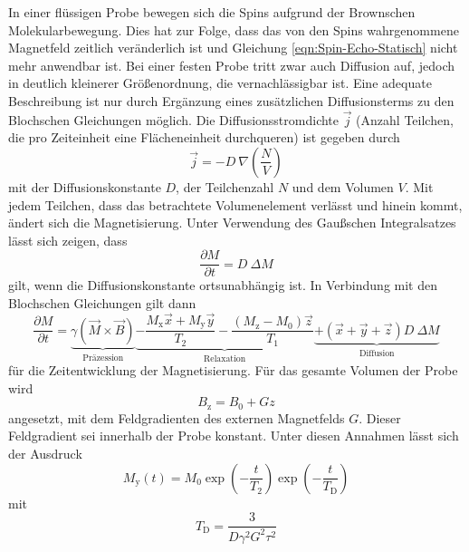 In einer flüssigen Probe bewegen sich die Spins aufgrund der Brownschen
Molekularbewegung.
Dies hat zur Folge, dass das von den Spins wahrgenommene Magnetfeld
zeitlich veränderlich ist und Gleichung \eqref{eqn:Spin-Echo-Statisch} nicht mehr
anwendbar ist.
Bei einer festen Probe tritt zwar auch Diffusion auf, jedoch in deutlich kleinerer
Größenordnung, die vernachlässigbar ist.
Eine adequate Beschreibung ist nur durch Ergänzung eines zusätzlichen Diffusionsterms
zu den Blochschen Gleichungen möglich.
Die Diffusionsstromdichte $\vec{j}$ (Anzahl Teilchen, die pro Zeiteinheit eine
Flächeneinheit durchqueren) ist gegeben durch
\begin{equation*}
  \vec{j} = - D\:\nabla\!\left(\frac{N}{V}\right)
\end{equation*}
mit der Diffusionskonstante $D$, der Teilchenzahl $N$ und dem Volumen $V$.
Mit jedem Teilchen, dass das betrachtete Volumenelement verlässt und hinein kommt,
ändert sich die Magnetisierung.
Unter Verwendung des Gaußschen Integralsatzes lässt sich zeigen, dass
\begin{equation*}
  \frac{\partial M}{\partial t} = D\:\Delta M
\end{equation*}
gilt, wenn die Diffusionskonstante ortsunabhängig ist.
In Verbindung mit den Blochschen Gleichungen gilt dann
\begin{equation*}
  \frac{\partial M}{\partial t} =
  \underbrace{\gamma \left(\vec{M} \times \vec{B}\right)}_{\text{Präzession}}
  \underbrace{- \frac{M_\text{x} \vec{x} + M_\text{y} \vec{y}}{T_2}
  - \frac{\left(M_\text{z} - M_0\right) \vec{z}}{T_1}}_{\text{Relaxation}}
  \underbrace{+ \left(\vec{x} + \vec{y} + \vec{z}\right) D\:\Delta M}_{\text{Diffusion}}
\end{equation*}
für die Zeitentwicklung der Magnetisierung.
Für das gesamte Volumen der Probe wird
\begin{equation*}
  B_\text{z} = B_0 + G z
\end{equation*}
angesetzt, mit dem Feldgradienten des externen Magnetfelds $G$.
Dieser Feldgradient sei innerhalb der Probe konstant.
Unter diesen Annahmen lässt sich der Ausdruck
\begin{equation*}
  M_\text{y}\!\left(t\right) = M_0
  \exp\!\left(- \frac{t}{T_2}\right)
  \exp\!\left(- \frac{t}{T_\text{D}}\right)
\end{equation*}
mit
\begin{equation*}
  T_\text{D} = \frac{3}{D \gamma^2 G^2 \tau^2}
\end{equation*}
